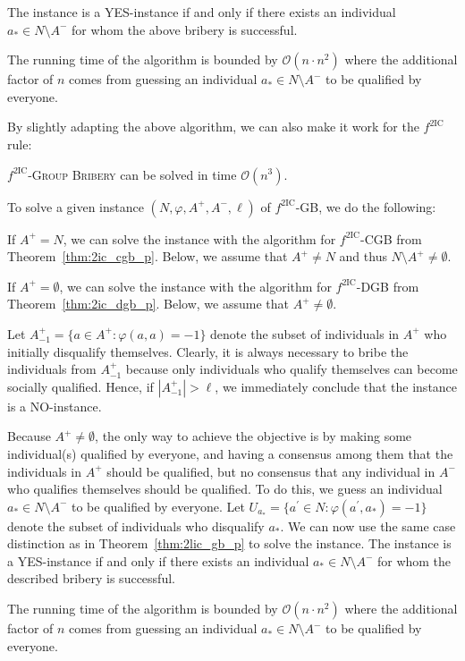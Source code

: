\documentclass[
    12pt,               %
    a4paper,            %
    bibtotoc,           %
    pointlessnumbers,   %
    ngerman,            %
    titlepage,          %
    leqno,              %
    ]{scrarticle}       %
\newcommand\thmref{Theorem~\ref}
\begin{document}
\begin{Proof}
The instance is a YES-instance if and only if there exists an individual $a_\ast \in N \setminus A^-$ for whom the above bribery is successful.

The running time of the algorithm is bounded by $\mathcal{O}(n \cdot n^2)$ where the additional factor of $n$ comes from guessing an individual $a_\ast \in N \setminus A^-$ to be qualified by everyone.
\end{Proof}



By slightly adapting the above algorithm, we can also make it work for the $f^{\text{2IC}}$ rule:

\begin{Corollary} \label{cor:2ic_gb_p}
$f^{\text{2IC}}$-\textsc{Group Bribery} can be solved in time $\mathcal{O}(n^3)$.
\end{Corollary}

\begin{Proof}
To solve a given instance $(N, \varphi, A^+, A^-, \ell)$ of $f^{\text{2IC}}$-GB, we do the following:

If $A^+ = N$, we can solve the instance with the algorithm for $f^{\text{2IC}}$-CGB from \thmref{thm:2ic_cgb_p}. Below, we assume that $A^+ \neq N$ and thus $N \setminus A^+ \neq \emptyset$.

If $A^+ = \emptyset$, we can solve the instance with the algorithm for $f^{\text{2IC}}$-DGB from \thmref{thm:2ic_dgb_p}. Below, we assume that $A^+ \neq \emptyset$.

Let $A^+_{-1} = \{ a \in A^+ : \varphi(a, a) = -1 \}$ denote the subset of individuals in $A^+$ who initially disqualify themselves. Clearly, it is always necessary to bribe the individuals from $A^+_{-1}$ because only individuals who qualify themselves can become socially qualified. Hence, if $|A^+_{-1}| > \ell$, we immediately conclude that the instance is a NO-instance.

Because $A^+ \neq \emptyset$, the only way to achieve the objective is by making some individual(s) qualified by everyone, and having a consensus among them that the individuals in $A^+$ should be qualified, but no consensus that any individual in $A^-$ who qualifies themselves should be qualified. To do this, we guess an individual $a_\ast \in N \setminus A^-$ to be qualified by everyone. Let $U_{a_\ast} = \{ a^\prime \in N : \varphi(a^\prime, a_\ast) = -1 \}$ denote the subset of individuals who disqualify $a_\ast$. We can now use the same case distinction as in \thmref{thm:2lic_gb_p} to solve the instance. The instance is a YES-instance if and only if there exists an individual $a_\ast \in N \setminus A^-$ for whom the described bribery is successful.

The running time of the algorithm is bounded by $\mathcal{O}(n \cdot n^2)$ where the additional factor of $n$ comes from guessing an individual $a_\ast \in N \setminus A^-$ to be qualified by everyone.
\end{Proof}
\end{document}
